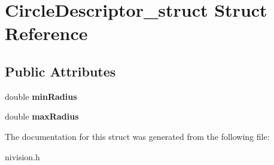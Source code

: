 \hypertarget{structCircleDescriptor__struct}{
\section{CircleDescriptor\_\-struct Struct Reference}
\label{structCircleDescriptor__struct}
}
\subsection*{Public Attributes}
\begin{DoxyCompactItemize}
\item 
\hypertarget{structCircleDescriptor__struct_a4f4b9ecc5e5dba6911c0c6e3b6c03894}{
double {\bfseries minRadius}}
\label{structCircleDescriptor__struct_a4f4b9ecc5e5dba6911c0c6e3b6c03894}

\item 
\hypertarget{structCircleDescriptor__struct_a0064cd6f2c97b9ad800a9dbcc0230a33}{
double {\bfseries maxRadius}}
\label{structCircleDescriptor__struct_a0064cd6f2c97b9ad800a9dbcc0230a33}

\end{DoxyCompactItemize}


The documentation for this struct was generated from the following file:\begin{DoxyCompactItemize}
\item 
nivision.h\end{DoxyCompactItemize}
